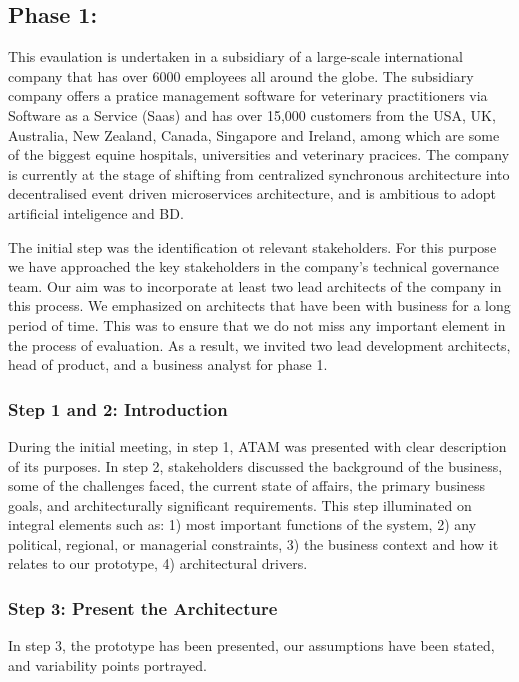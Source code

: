 \documentclass[review]{elsarticle}
\begin{document}
\subsection{Phase 1:}

This evaulation is undertaken in a subsidiary of a large-scale international company that has over 6000 employees all around the globe. The subsidiary company offers a pratice management software for veterinary practitioners via Software as a Service (Saas) and has over 15,000 customers from the USA, UK, Australia, New Zealand, Canada, Singapore and Ireland, among which are some of the biggest equine hospitals, universities and veterinary pracices. The company is currently at the stage of shifting from centralized synchronous architecture into decentralised event driven microservices architecture, and is ambitious to adopt artificial inteligence and BD.

The initial step was the identification ot relevant stakeholders. For this purpose we have approached the key stakeholders in the company's technical governance team. Our aim was to incorporate at least two lead architects of the company in this process. We emphasized on architects that have been with business for a long period of time. This was to ensure that we do not miss any important element in the process of evaluation. As a result, we invited two lead development architects, head of product, and a business analyst for phase 1.


\subsubsection{Step 1 and 2: Introduction}

During the initial meeting, in step 1, ATAM was presented with clear description of its purposes. In step 2, stakeholders discussed the background of the business, some of the challenges faced, the current state of affairs, the primary business goals, and architecturally significant requirements. This step illuminated on integral elements such as: 1) most important functions of the system, 2) any political, regional, or managerial constraints, 3) the business context and how it relates to our prototype, 4) architectural drivers.


\subsubsection{Step 3: Present the Architecture}

In step 3, the prototype has been presented, our assumptions have been stated, and variability points portrayed. 
\end{document}
